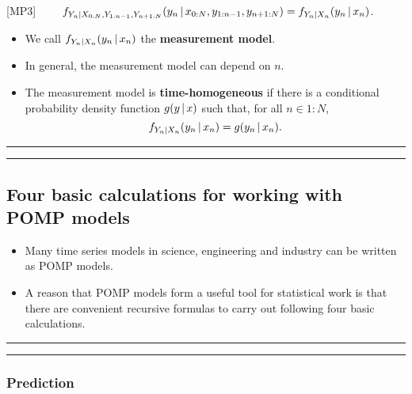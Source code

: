 \documentclass[]{article}
\begin{document}
{[}MP3{]}
\(\quad\quad f_{Y_n|X_{0:N},Y_{1:n-1},Y_{n+1:N}}(y_n{\, | \,} x_{0:N},y_{1:n-1},y_{n+1:N}) = f_{Y_n|X_n}(y_n{\, | \,} x_{n})\).

\begin{itemize}
\item
  We call \(f_{Y_n|X_n}(y_n{\, | \,} x_{n})\) the \textbf{measurement
  model}.
\item
  In general, the measurement model can depend on \(n\).
\item
  The measurement model is \textbf{time-homogeneous} if there is a
  conditional probability density function \(g(y{\, | \,} x)\) such that,
  for all \(n\in 1:N\),
  \[ f_{Y_n|X_n}(y_n{\, | \,} x_{n})= g(y_n{\, | \,} x_n).\]
\end{itemize}

\begin{center}\rule{0.5\linewidth}{\linethickness}\end{center}

\begin{center}\rule{0.5\linewidth}{\linethickness}\end{center}

\subsection{Four basic calculations for working with POMP
models}\label{four-basic-calculations-for-working-with-pomp-models}

\begin{itemize}
\item
  Many time series models in science, engineering and industry can be
  written as POMP models.
\item
  A reason that POMP models form a useful tool for statistical work is
  that there are convenient recursive formulas to carry out following
  four basic calculations.
\end{itemize}

\begin{center}\rule{0.5\linewidth}{\linethickness}\end{center}

\begin{center}\rule{0.5\linewidth}{\linethickness}\end{center}

\subsubsection{Prediction}\label{prediction}
\end{document}
